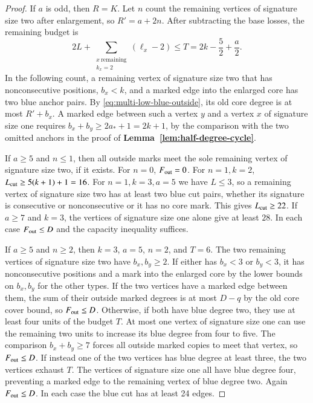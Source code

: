 \documentclass[preprint,11pt,numbers]{elsarticle-arxiv}
\numberwithin{equation}{section}
\theoremstyle{definition}
\begin{document}
\begin{proof}
If $a$ is odd, then $R=K$. Let $n$ count the remaining vertices
of signature size two after enlargement, so $R'=a+2n$. After
subtracting the base losses, the remaining budget is
\begin{equation}\label{eq:multi-small-odd-budget}
 2L+\sum_{\substack{x\ \text{remaining}\\ k_x=2}}(\ell_x-2)
 \le T=2k-\frac{5}{2}+\frac{a}{2} .
\end{equation}
In the following count, a remaining vertex of signature size two
that has nonconsecutive positions, $b_x<k$, and a marked edge
into the enlarged core has two blue anchor pairs. By
\eqref{eq:multi-low-blue-outside}, its old core degree is at
most $R'+b_x$. A marked edge between such a vertex $y$ and a
vertex $x$ of signature size one requires
$b_x+b_y\ge2a_*+1=2k+1$, by the comparison with the two
omitted anchors in the proof of \textbf{Lemma~\ref{lem:half-degree-cycle}}.

If $a\ge5$ and $n\le1$, then all outside marks meet the sole
remaining vertex of signature size two, if it exists. For $n=0$,
$F_{\rm out}=0$. For $n=1,k=2$, $L_{\rm cut}\ge5(k+1)+1=16$.
For $n=1,k=3,a=5$ we have $L\le3$, so a remaining vertex
of signature size two has at least two blue cut pairs, whether
its signature is consecutive or nonconsecutive or it has no
core mark. This gives $L_{\rm cut}\ge22$. If $a\ge7$ and
$k=3$, the vertices of signature size one alone give at least
$28$. In each case $F_{\rm out}\le D$ and the capacity inequality suffices.

If $a\ge5$ and $n\ge2$, then $k=3$, $a=5$, $n=2$, and
$T=6$. The two remaining vertices of signature size two have
$b_x,b_y\ge2$. If either has $b_x<3$ or $b_y<3$, it has
nonconsecutive positions and a mark into the enlarged core by
the lower bounds on $b_x,b_y$ for the other types. If the two
vertices have a marked edge between them, the sum of their
outside marked degrees is at most $D-q$ by the old core cover
bound, so $F_{\rm out}\le D$. Otherwise, if both have blue degree two,
they use at least four units of the budget $T$. At most one
vertex of signature size one can use the remaining two units
to increase its blue degree from four to five. The comparison
$b_x+b_y\ge7$ forces all outside marked copies to meet that
vertex, so $F_{\rm out}\le D$. If instead one of the two vertices has
blue degree at least three, the two vertices exhaust $T$.
The vertices of signature size one all have blue degree four,
preventing a marked edge to the remaining vertex of blue
degree two. Again $F_{\rm out}\le D$. In each case the blue cut has at
least 24 edges.


\end{proof}
\end{document}
